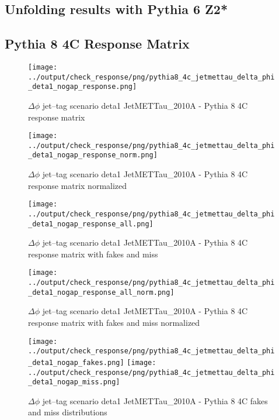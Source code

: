 \documentclass[11pt]{book}
\begin{document}
\clearpage
\subsection{Unfolding results with Pythia 6 Z2*}


\clearpage
\subsection{Pythia 8 4C Response Matrix}


\begin{figure}[ht]
\centering
\texttt{[image: ../output/check\_response/png/pythia8\_4c\_jetmettau\_delta\_phi\_deta1\_nogap\_response.png]}
\caption{$\Delta\phi$ jet--tag scenario deta1 JetMETTau\_2010A - Pythia 8 4C response matrix}
\label{p8_jetmettau_delta_phi_deta1_nogap_response}
\end{figure}

\begin{figure}[ht]
\centering
\texttt{[image: ../output/check\_response/png/pythia8\_4c\_jetmettau\_delta\_phi\_deta1\_nogap\_response\_norm.png]}
\caption{$\Delta\phi$ jet--tag scenario deta1 JetMETTau\_2010A - Pythia 8 4C response matrix normalized}
\label{p8_jetmettau_delta_phi_deta1_nogap_response_norm}
\end{figure}

\begin{figure}[ht]
\centering
\texttt{[image: ../output/check\_response/png/pythia8\_4c\_jetmettau\_delta\_phi\_deta1\_nogap\_response\_all.png]}
\caption{$\Delta\phi$ jet--tag scenario deta1 JetMETTau\_2010A - Pythia 8 4C response matrix with fakes and miss}
\label{p8_jetmettau_delta_phi_deta1_nogap_response_all}
\end{figure}

\begin{figure}[ht]
\centering
\texttt{[image: ../output/check\_response/png/pythia8\_4c\_jetmettau\_delta\_phi\_deta1\_nogap\_response\_all\_norm.png]}
\caption{$\Delta\phi$ jet--tag scenario deta1 JetMETTau\_2010A - Pythia 8 4C response matrix with fakes and miss normalized}
\label{p8_jetmettau_delta_phi_deta1_nogap_response_all_norm}
\end{figure}

\begin{figure}[ht]
\centering
\texttt{[image: ../output/check\_response/png/pythia8\_4c\_jetmettau\_delta\_phi\_deta1\_nogap\_fakes.png]}
\texttt{[image: ../output/check\_response/png/pythia8\_4c\_jetmettau\_delta\_phi\_deta1\_nogap\_miss.png]}
\caption{$\Delta\phi$ jet--tag scenario deta1 JetMETTau\_2010A - Pythia 8 4C fakes and miss distributions}
\label{p8_jetmettau_delta_phi_deta1_nogap_fakesmiss}
\end{figure}
\end{document}
